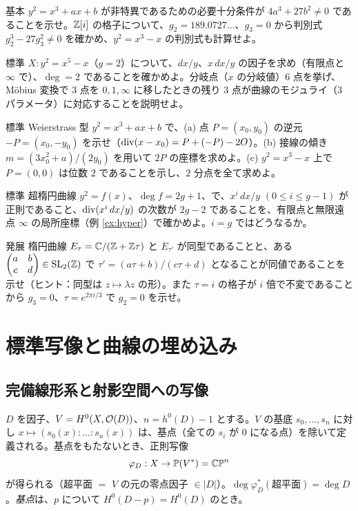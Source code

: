 \begin{prob}{基本}\label{p:gstar}
$y^2=x^3+ax+b$ が非特異であるための必要十分条件が $4a^3+27b^2\ne0$ であることを示せ。$\mathbb Z[i]$ の格子について、$g_2=189.0727\ldots$、$g_3=0$ から判別式 $g_2^3-27g_3^2\ne0$ を確かめ、$y^2=x^3-x$ の判別式も計算せよ。
\end{prob}
\begin{prob}{標準}\label{p:y5}
$X:y^2=x^5-x$（$g=2$）について、$dx/y$、$x\,dx/y$ の因子を求め（有限点と $\infty$ で）、$\deg=2$ であることを確かめよ。分岐点（$x$ の分岐値）6 点を挙げ、Möbius 変換で 3 点を $0,1,\infty$ に移したときの残り 3 点が曲線のモジュライ（3 パラメータ）に対応することを説明せよ。
\end{prob}
\begin{prob}{標準}\label{p:chord}
Weierstrass 型 $y^2=x^3+ax+b$ で、(a) 点 $P=(x_0,y_0)$ の逆元 $-P=(x_0,-y_0)$ を示せ（$\operatorname{div}(x-x_0)=P+(-P)-2O$）。(b) 接線の傾き $m=(3x_0^2+a)/(2y_0)$ を用いて $2P$ の座標を求めよ。(c) $y^2=x^3-x$ 上で $P=(0,0)$ は位数 $2$ であることを示し、$2$ 分点を全て求めよ。
\end{prob}
\begin{prob}{標準}\label{p:Hodiv}
超楕円曲線 $y^2=f(x)$、$\deg f=2g+1$、で、$x^i\,dx/y$ $(0\le i\le g-1)$ が正則であること、$\operatorname{div}(x^i\,dx/y)$ の次数が $2g-2$ であることを、有限点と無限遠点 $\infty$ の局所座標（例 \ref{ex:hyper}）で確かめよ。$i=g$ ではどうなるか。
\end{prob}
\begin{prob}{発展}\label{p:j}
楕円曲線 $E_\tau=\mathbb C/(\mathbb Z+\mathbb Z\tau)$ と $E_{\tau'}$ が同型であることと、ある $\begin{pmatrix}a&b\\c&d\end{pmatrix}\in\mathrm{SL}_2(\mathbb Z)$ で $\tau'=(a\tau+b)/(c\tau+d)$ となることが同値であることを示せ（ヒント：同型は $z\mapsto\lambda z$ の形）。また $\tau=i$ の格子が $i$ 倍で不変であることから $g_3=0$、$\tau=e^{2\pi i/3}$ で $g_2=0$ を示せ。
\end{prob}

\section{標準写像と曲線の埋め込み}\label{sec:embed}

\subsection{完備線形系と射影空間への写像}
$D$ を因子、$V=H^0(X,\mathcal O(D))$、$n=h^0(D)-1$ とする。$V$ の基底 $s_0,\dots,s_n$ に対し $x\mapsto(s_0(x):\dots:s_n(x))$ は、基点（全ての $s_i$ が $0$ になる点）を除いて定義される。基点をもたないとき、正則写像
\[
\varphi_D:X\to\mathbb P(V^*)=\mathbb{CP}^n
\]
が得られる（超平面 $=$ $V$ の元の零点因子 $\in|D|$）。$\deg\varphi_D^*(\text{超平面})=\deg D$。\emph{基点}は、$p$ について $H^0(D-p)=H^0(D)$ のとき。

